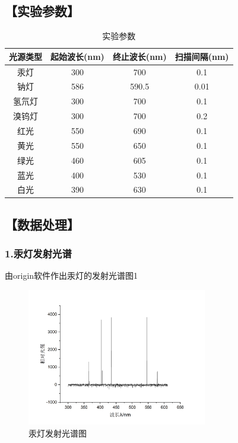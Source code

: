 \documentclass[12pt,a4paper,UTF8]{ctexart}
\begin{document}
\newpage
\subsection*{【实验参数】}
\begin{table}[htbp]
	\caption{实验参数}
	\centering
    \begin{tabular}{cccc}
	\toprule
    光源类型 &起始波长(nm)&终止波长(nm)&扫描间隔(nm)\\
	\midrule
	汞灯&300&700&0.1\\
	钠灯&586&590.5&0.01\\
    氢氘灯&300&700&0.1\\
	溴钨灯&300&700&0.2\\
	红光&550&690&0.1\\
	黄光&550&650&0.1\\
	绿光&460&605&0.1\\
	蓝光&400&530&0.1\\
	白光&390&630&0.1\\
	\bottomrule
	\end{tabular}%
	\label{tab:data}%
\end{table}%


\subsection*{【数据处理】}
\subsubsection*{1.汞灯发射光谱}
由origin软件作出汞灯的发射光谱图1

\begin{figure}[htbp]
	\centering
	\includegraphics[width=0.7\textwidth]{img//Hg.png}
	\caption{汞灯发射光谱图}
	\label{fig:1}
\end{figure}
\end{document}
